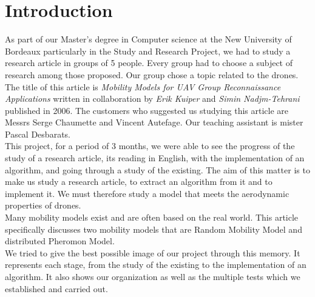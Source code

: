 \chapter*{Introduction}

As part of our Master's degree in Computer science at the New University of Bordeaux particularly in the Study and Research Project, we had to study a research article in groups of 5 people. Every group had to choose a subject of research among those proposed. Our group chose a topic related to the drones. The title of this article is \textit{Mobility Models for UAV Group Reconnaissance Applications} written in collaboration by \textit{Erik Kuiper} and \textit{Simin Nadjm-Tehrani} published in 2006. The customers who suggested us studying this article are Messrs Serge Chaumette and Vincent Autefage. Our teaching assistant is mister Pascal Desbarats.\\

This project, for a period of 3 months, we were able to see the progress of the study of a research article, its reading in English, with the implementation of an algorithm, and going through a study of the existing.
The aim of this matter is to make us study a research article, to extract an algorithm from it and to implement it.
We must therefore study a model that meets the aerodynamic properties of drones.\\

Many mobility models exist and are often based on the real world.
This article specifically discusses two mobility models that are Random Mobility Model and distributed Pheromon Model.\\

We tried to give the best possible image of our project through this memory. It represents each stage, from the study of the existing to the implementation of an algorithm. It also shows our organization as well as the multiple tests which we established and carried out. 
